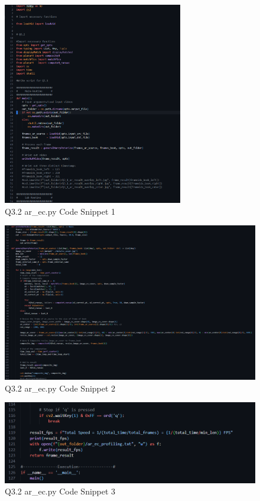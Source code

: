 \documentclass{article}
\begin{document}
	\begin{figure}[H]
		\centering
		\includegraphics[width=0.7\textwidth]{./Q3_2_ar_ec_cns1.png}  %
		\caption{Q3.2 ar\_ec.py Code Snippet 1}
		\label{fig:Q32_ar_ec_cns1}
	\end{figure}
	\begin{figure}[H]
		\centering
		\includegraphics[width=\textwidth]{./Q3_2_ar_ec_cns2.png}  %
		\caption{Q3.2 ar\_ec.py Code Snippet 2}
		\label{fig:Q32_ar_ec_cns2}
	\end{figure}
	\begin{figure}[H]
		\centering
		\includegraphics[width=\textwidth]{./Q3_2_ar_ec_cns3.png}  %
		\caption{Q3.2 ar\_ec.py Code Snippet 3}
		\label{fig:Q32_ar_ec_cns3}
	\end{figure}
\end{document}
